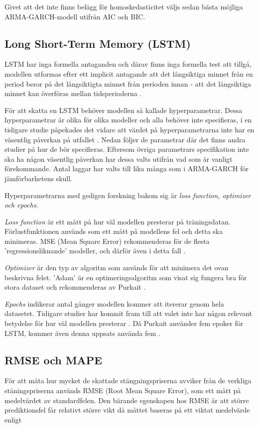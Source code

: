 \documentclass[11pt]{article}
\begin{document}
Givet att det inte finns belägg för homoskedasticitet väljs sedan bästa möjliga ARMA-GARCH-modell utifrån AIC och BIC. 


\subsection{Long Short-Term Memory (LSTM)}
LSTM har inga formella antaganden och därav finns inga formella test att tillgå, modellen utformas efter ett implicit antagande att det långsiktiga minnet från en period beror på det långsiktigta minnet från perioden innan - att det långsiktiga minnet kan överföras mellan tidsperioderna \parencite{tao2018advanced}.

För att skatta en LSTM behöver modellen så kallade hyperparametrar. Dessa hyperparametrar är olika för olika modeller och alla behöver inte specifieras, i en tidigare studie påpekades det vidare att värdet på hyperparametrarna inte har en väsentlig påverkan på utfallet \parencite{dreyfus2005neural}. Nedan följer de parametrar där det finns andra studier på hur de bör specifieras. Eftersom övriga parametrars specifikation inte ska ha någon väsentlig påverkan har dessa valts utifrån vad som är vanligt förekommande. Antal laggar har valts till lika många som i ARMA-GARCH för jämförbarhetens skull.

Hyperparametrarna med gedigen forskning bakom sig är \emph{loss function, optimizer och epochs}. \par
\emph{Loss function} är ett mått på hur väl modellen presterar på träningsdatan. Förlustfunktionen används som ett mått på modellens fel och detta ska minimeras. MSE (Mean Square Error) rekommenderas för de flesta 'regressionsliknande' modeller, och därför även i detta fall \parencite{purkait2019hands}. \par
\emph{Optimizer} är den typ av algoritm som används för att minimera det ovan beskrivna felet. 'Adam' är en optimeringsalgoritm som visat sig fungera bra för stora dataset och rekommenderas av Purkait \parencite{purkait2019hands}. \par
\emph{Epochs} indikerar antal gånger modellen kommer att itererar genom hela datasetet. Tidigare studier har kommit fram till att valet inte har någon relevant betydelse för hur väl modellen presterar \parencite{siami2018forecasting}. Då Purkait använder fem epoker för LSTM, kommer även denna uppsats använda fem \parencite{purkait2019hands}. \par

\subsection{RMSE och MAPE}
För att mäta hur mycket de skattade stängningspriserna avviker från de verkliga stäningspriserna används RMSE (Root Mean Square Error), som ett mått på medelvärdet av standardfelen. Den bärande egenskapen hos RMSE är att större prediktionsfel får relativt större vikt då måttet baseras på ett viktat medelvärde enligt
\end{document}
